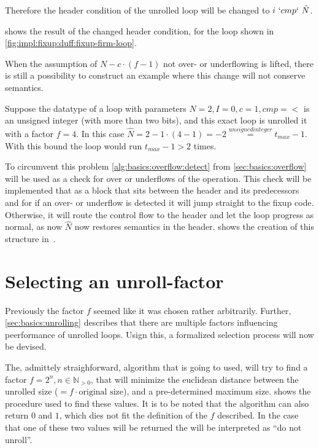 Therefore the header condition of the unrolled loop will be changed to $i~`cmp`~\hat{N}$.

 shows the result of the changed header condition, for the loop shown in \cref{fig:impl:fixup:duff:fixup-firm-loop}.



When the assumption of $N - c \cdot (f - 1)$ not over- or underflowing is lifted, there is still a possibility to construct an example where this change will not conserve semantics.

Suppose the datatype of a loop with parameters $N = 2, I = 0, c = 1, cmp = <$ is an unsigned integer (with more than two bits), and this exact loop is unrolled it with a factor $f = 4$.
In this case $\hat{N} = 2 - 1 \cdot (4 - 1) = -2 \overset{unsigned integer}{=} t_{max} - 1$.
With this bound the loop would run $t_{max} - 1 > 2$ times.

To circumvent this problem \cref{alg:basics:overflow:detect} from \cref{sec:basics:overflow} will be used as a check for over or underflows of the operation.
This check will be implemented that as a block that sits between the header and its predecessors and for if an over- or underflow is detected it will jump straight to the fixup code.
Otherwise, it will route the control flow to the header and let the loop progress as normal, as now $\hat{N}$ now restores semantics in the header.
 shows the creation of this structure in~\libFIRM.




\section{Selecting an unroll-factor}\label{sec:impl:sel-factor}

Previously the factor $f$ seemed like it was chosen rather arbitrarily.
Further, \cref{sec:basics:unrolling} describes that there are multiple factors influencing peerformance of unrolled loops.
Usign this, a formalized selection process will now be devised.

The, admittely straighforward, algorithm that is going to used, will try to find a factor $f = 2^n, n \in \mathbb{N}_{>0}$, that will minimize the euclidean distance between the unrolled size ($= f \cdot \text{original size}$), and a pre-determined maximum size.
 shows the procedure used to find these values.
It is to be noted that the algorithm can also return $0$ and $1$, which dies not fit the definition of the $f$ described.
In the case that one of these two values will be returned the will be interpreted as ``do not unroll''.

